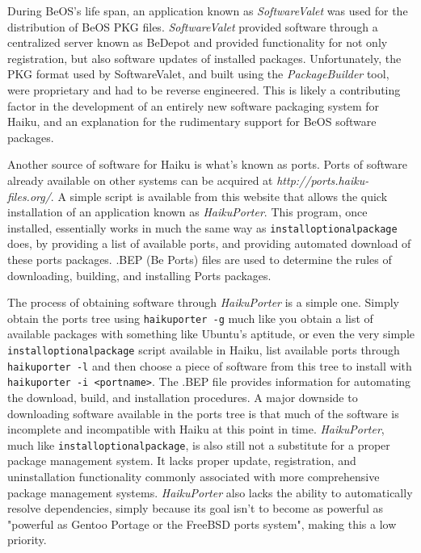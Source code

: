 \documentclass{article}
\begin{document}
During BeOS's life span, an application known as \textit{SoftwareValet} was used for the distribution of BeOS PKG files. \textit{SoftwareValet} provided software through a centralized server known as BeDepot\cite{SoftwareValet} and provided functionality for not only registration, but also software updates of installed packages. Unfortunately, the PKG format used by SoftwareValet, and built using the \textit{PackageBuilder} tool, were proprietary and had to be reverse engineered.\cite{OpeningPkgFiles} This is likely a contributing factor in the development of an entirely new software packaging system for Haiku, and an explanation for the rudimentary support for BeOS software packages.

Another source of software for Haiku is what's known as ports. Ports of software already available on other systems can be acquired at \textit{http://ports.haiku-files.org/}. A simple script is available from this website that allows the quick installation of an application known as \textit{HaikuPorter}. This program, once installed, essentially works in much the same way as \texttt{installoptionalpackage} does, by providing a list of available ports, and providing automated download of these ports packages. .BEP (Be Ports) files are used to determine the rules of downloading, building, and installing Ports packages.\cite{BepFiles}

The process of obtaining software through \textit{HaikuPorter} is a simple one. Simply obtain the ports tree using \texttt{haikuporter -g} much like you obtain a list of available packages with something like Ubuntu's aptitude, or even the very simple \texttt{installoptionalpackage} script available in Haiku, list available ports through \texttt{haikuporter -l} and then choose a piece of software from this tree to install with \texttt{haikuporter -i <portname>}. The .BEP file provides information for automating the download, build, and installation procedures.\cite{BepFiles} A major downside to downloading software available in the ports tree is that much of the software is incomplete and incompatible with Haiku at this point in time. \textit{HaikuPorter}, much like \texttt{installoptionalpackage}, is also still not a substitute for a proper package management system. It lacks proper update, registration, and uninstallation functionality commonly associated with more comprehensive package management systems. \textit{HaikuPorter} also lacks the ability to automatically resolve dependencies, simply because its goal isn't to become as powerful as "powerful as Gentoo Portage or the FreeBSD ports system", making this a low priority.\cite{HaikuPorter}
\end{document}
